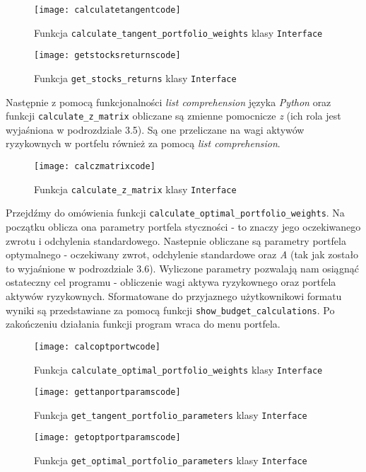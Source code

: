 \documentclass[magister]{dyplom}
\def\code#1{\texttt{#1}}
\begin{document}
\begin{figure}[ht]
	\centering
	\texttt{[image: calculatetangentcode]}
	\caption{Funkcja \code{calculate\_tangent\_portfolio\_weights} klasy \code{Interface}}
\end{figure}

\begin{figure}[ht]
	\centering
	\texttt{[image: getstocksreturnscode]}
	\caption{Funkcja \code{get\_stocks\_returns} klasy \code{Interface}}
\end{figure}

Następnie z pomocą funkcjonalności \textit{list comprehension} języka \textit{Python}\cite{pythonlist} oraz funkcji \code{calculate\_z\_matrix} obliczane są zmienne pomocnicze \textit{z} (ich rola jest wyjaśniona w podrozdziale 3.5). Są one przeliczane na wagi aktywów ryzykownych w portfelu również za pomocą \textit{list comprehension}.

\begin{figure}[ht]
	\centering
	\texttt{[image: calczmatrixcode]}
	\caption{Funkcja \code{calculate\_z\_matrix} klasy \code{Interface}}
\end{figure}
\newpage
Przejdźmy do omówienia funkcji \code{calculate\_optimal\_portfolio\_weights}. Na początku oblicza ona parametry portfela styczności - to znaczy jego oczekiwanego zwrotu i odchylenia standardowego. Nastepnie obliczane są parametry portfela optymalnego - oczekiwany zwrot, odchylenie standardowe oraz \textit{A} (tak jak zostało to wyjaśnione w podrozdziale 3.6). Wyliczone parametry pozwalają nam osiągnąć ostateczny cel programu - obliczenie wagi aktywa ryzykownego oraz portfela aktywów ryzykownych. Sformatowane do przyjaznego użytkownikowi formatu wyniki są przedstawiane za pomocą funkcji \code{show\_budget\_calculations}. Po zakończeniu działania funkcji program wraca do menu portfela.

\begin{figure}[ht]
	\centering
	\texttt{[image: calcoptportwcode]}
	\caption{Funkcja \code{calculate\_optimal\_portfolio\_weights} klasy \code{Interface}}
\end{figure}

\begin{figure}[h]
	\centering
	\texttt{[image: gettanportparamscode]}
	\caption{Funkcja \code{get\_tangent\_portfolio\_parameters} klasy \code{Interface}}
\end{figure}

\begin{figure}[h]
	\centering
	\texttt{[image: getoptportparamscode]}
	\caption{Funkcja \code{get\_optimal\_portfolio\_parameters} klasy \code{Interface}}
\end{figure}
\end{document}
